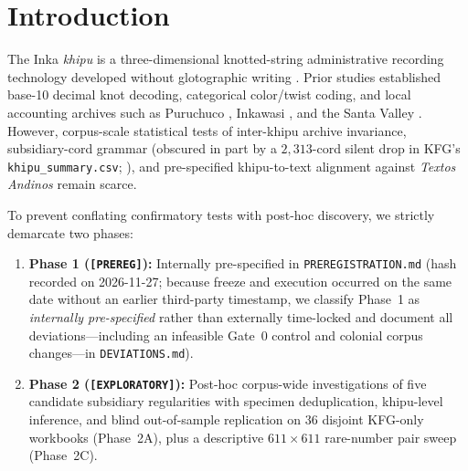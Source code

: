 \documentclass[11pt,a4paper]{article}
\begin{document}
\begin{abstract}
$\leftrightarrow$ \texttt{VA 63038(B)}, $73/105$ cells, $r = 0.945$ via targeted lot inspection; conditional post-selection $p \le 10^{-4}$ without sweep-wide multiplicity correction) and $\#3/538$ (putative reversed physical duplicate \texttt{VA 24370(B)} $\leftrightarrow$ \texttt{VA 66834}, $27/29$ values, cord-length $r = 0.977$), both pending museum verification. Finally (\texttt{[PREREG]}), against five highland \emph{Textos Andinos} schemas (three non-independent Huaraz tables plus Chucuito and Sacaca), we obtain $0/30$ exact-arity ($0/70$ for $|k_K - k_D| = 1$) BH-FDR hits; at $20\%$ multiplicative noise, BH-FDR ($m=30$) detection power is $70.8\%$ ($k=5$), $59.2\%$ ($k=7$), and $0\%$ for an isolated $k=6$ hit due to a $2/720$ Null~1 discreteness floor (nominal $p < 0.05$ power $96.7\text{--}100\%$), supporting the working hypothesis that cross-modal alignment is currently bottlenecked by coastal-versus-highland archival mismatch.
\end{abstract}

\section{Introduction}

The Inka \emph{khipu} is a three-dimensional knotted-string administrative recording technology developed without glotographic writing \citep{ascher1981code,urton2003signs,brokaw2010history,urton2017inka}. Prior studies established base-10 decimal knot decoding, categorical color/twist coding, and local accounting archives such as Puruchuco \citep{urton2005khipu}, Inkawasi \citep{urton2015accounting}, and the Santa Valley \citep{medrano2018toward,medrano2021quipu}. However, corpus-scale statistical tests of inter-khipu archive invariance, subsidiary-cord grammar (obscured in part by a $2{,}313$-cord silent drop in KFG's \texttt{khipu\_summary.csv}; \citealt{khosla2024kfg,okr2025v210}), and pre-specified khipu-to-text alignment against \emph{Textos Andinos} \citep{parssinen2004textos} remain scarce.

To prevent conflating confirmatory tests with post-hoc discovery, we strictly demarcate two phases:
\begin{enumerate}
  \item \textbf{Phase 1 (\texttt{[PREREG]}):} Internally pre-specified in \texttt{PREREGISTRATION.md} (hash recorded on 2026-11-27; because freeze and execution occurred on the same date without an earlier third-party timestamp, we classify Phase~1 as \emph{internally pre-specified} rather than externally time-locked and document all deviations---including an infeasible Gate~0 control and colonial corpus changes---in \texttt{DEVIATIONS.md}).
  \item \textbf{Phase 2 (\texttt{[EXPLORATORY]}):} Post-hoc corpus-wide investigations of five candidate subsidiary regularities with specimen deduplication, khipu-level inference, and blind out-of-sample replication on $36$ disjoint KFG-only workbooks (Phase~2A), plus a descriptive $611 \times 611$ rare-number pair sweep (Phase~2C).
\end{enumerate}
\end{document}

